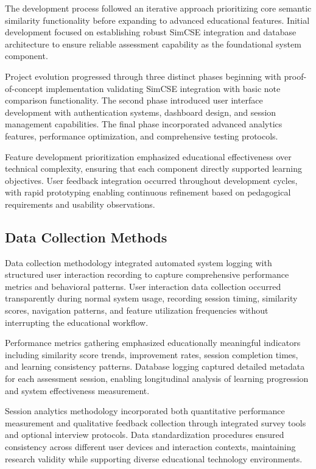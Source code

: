 {\color{maroon}
The development process followed an iterative approach prioritizing core semantic similarity functionality before expanding to advanced educational features. Initial development focused on establishing robust SimCSE integration and database architecture to ensure reliable assessment capability as the foundational system component.

Project evolution progressed through three distinct phases beginning with proof-of-concept implementation validating SimCSE integration with basic note comparison functionality. The second phase introduced user interface development with authentication systems, dashboard design, and session management capabilities. The final phase incorporated advanced analytics features, performance optimization, and comprehensive testing protocols.

Feature development prioritization emphasized educational effectiveness over technical complexity, ensuring that each component directly supported learning objectives. User feedback integration occurred throughout development cycles, with rapid prototyping enabling continuous refinement based on pedagogical requirements and usability observations.
}

\subsection{Data Collection Methods}

{\color{maroon}
Data collection methodology integrated automated system logging with structured user interaction recording to capture comprehensive performance metrics and behavioral patterns. User interaction data collection occurred transparently during normal system usage, recording session timing, similarity scores, navigation patterns, and feature utilization frequencies without interrupting the educational workflow.

Performance metrics gathering emphasized educationally meaningful indicators including similarity score trends, improvement rates, session completion times, and learning consistency patterns. Database logging captured detailed metadata for each assessment session, enabling longitudinal analysis of learning progression and system effectiveness measurement.

Session analytics methodology incorporated both quantitative performance measurement and qualitative feedback collection through integrated survey tools and optional interview protocols. Data standardization procedures ensured consistency across different user devices and interaction contexts, maintaining research validity while supporting diverse educational technology environments.
}


